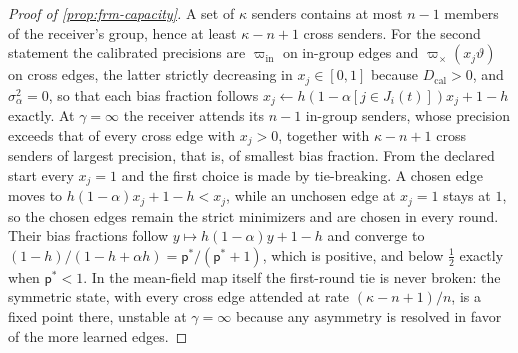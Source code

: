 \begin{proof}[Proof of \cref{prop:frm-capacity}]
A set of $\kappa$ senders contains at most $n-1$ members of the receiver's group, hence at least $\kappa-n+1$ cross senders. For the second statement the calibrated precisions are $\varpi_{\mathrm{in}}$ on in-group edges and $\varpi_\times(x_j\vartheta)$ on cross edges, the latter strictly decreasing in $x_j\in[0,1]$ because $D_{\mathrm{cal}}>0$, and $\sigma_\alpha^2=0$, so that each bias fraction follows $x_j\leftarrow h(1-\alpha[j\in J_i(t)])x_j+1-h$ exactly. At $\gamma=\infty$ the receiver attends its $n-1$ in-group senders, whose precision exceeds that of every cross edge with $x_j>0$, together with $\kappa-n+1$ cross senders of largest precision, that is, of smallest bias fraction. From the declared start every $x_j=1$ and the first choice is made by tie-breaking. A chosen edge moves to $h(1-\alpha)x_j+1-h<x_j$, while an unchosen edge at $x_j=1$ stays at $1$, so the chosen edges remain the strict minimizers and are chosen in every round. Their bias fractions follow $y\mapsto h(1-\alpha)y+1-h$ and converge to $(1-h)/(1-h+\alpha h)=\mathsf p^\ast/(\mathsf p^\ast+1)$, which is positive, and below $\frac12$ exactly when $\mathsf p^\ast<1$. In the mean-field map itself the first-round tie is never broken: the symmetric state, with every cross edge attended at rate $(\kappa-n+1)/n$, is a fixed point there, unstable at $\gamma=\infty$ because any asymmetry is resolved in favor of the more learned edges.
\end{proof}


